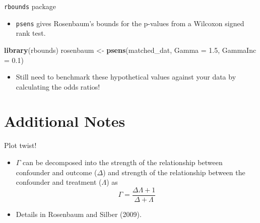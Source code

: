 \documentclass[ignorenonframetext,]{beamer}
\newenvironment{Shaded}{\begin{snugshade}}{\end{snugshade}}
\newcommand{\KeywordTok}[1]{\textcolor[rgb]{0.13,0.29,0.53}{\textbf{#1}}}
\newcommand{\DataTypeTok}[1]{\textcolor[rgb]{0.13,0.29,0.53}{#1}}
\newcommand{\FloatTok}[1]{\textcolor[rgb]{0.00,0.00,0.81}{#1}}
\newcommand{\StringTok}[1]{\textcolor[rgb]{0.31,0.60,0.02}{#1}}
\newcommand{\NormalTok}[1]{#1}
\providecommand{\tightlist}{%
  \setlength{\itemsep}{0pt}\setlength{\parskip}{0pt}}
\begin{document}
\begin{frame}[fragile]{\texttt{rbounds} package}

\begin{itemize}
\tightlist
\item
  \texttt{psens} gives Rosenbaum's bounds for the p-values from a
  Wilcoxon signed rank test.
\end{itemize}

\small

\begin{Shaded}
\begin{Highlighting}[]
\KeywordTok{library}\NormalTok{(rbounds)}
\NormalTok{rosenbaum <-}\StringTok{ }\KeywordTok{psens}\NormalTok{(matched_dat, }\DataTypeTok{Gamma =} \FloatTok{1.5}\NormalTok{, }\DataTypeTok{GammaInc =} \FloatTok{0.1}\NormalTok{)}
\end{Highlighting}
\end{Shaded}

\normalsize

\begin{table}[ht]
\centering
{}
\caption{Rosenbaum p-values} 
\end{table}

\begin{itemize}
\tightlist
\item
  Still need to benchmark these hypothetical values against your data by
  calculating the odds ratios!
\end{itemize}

\end{frame}

\section{Additional Notes}\label{additional-notes}

\begin{frame}{Plot twist!}

\begin{itemize}
\item
  \(\Gamma\) can be decomposed into the strength of the relationship
  between confounder and outcome (\(\Delta\)) and strength of the
  relationship between the confounder and treatment (\(\Lambda\)) as
  \[\Gamma = \frac{\Delta\Lambda + 1}{\Delta + \Lambda}\]
\item
  Details in Rosenbaum and Silber (2009).
\end{itemize}

\end{frame}
\end{document}
